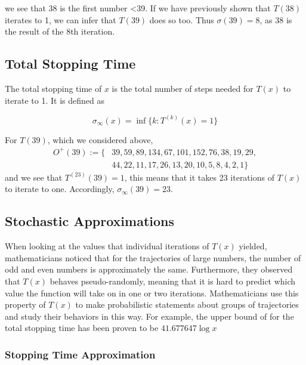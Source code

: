 \documentclass[12pt,a4paper,reqno]{amsart}
\begin{document}
we see that 38 is the first number <39. If we have previously shown that
$T(38)$ iterates to 1, we can infer that $T(39)$ does so too. Thus 
$\sigma(39) = 8$, as 38 is the result of the 8th iteration.

\subsection{Total Stopping Time}

The total stopping time of $x$ is the total number of steps needed for $T(x)$ 
to iterate to 1. It is defined as

\begin{equation}
    \nonumber
    \sigma_{\infty}(x)=\inf\{k:T^{(k)}(x)=1\} 
\end{equation}

For $T(39)$, which we considered above, 
\begin{align}
    \nonumber
    O^+(39):=\{&39,59,89,134,67,101,152,76,38,19,29,\\
    \nonumber
               &44,22,11,17,26,13,20,10,5,8,4,2,1\}
\end{align}
and we see that $T^{(23)}(39)=1$, this means that it takes 23 iterations of
$T(x)$ to iterate to one. Accordingly, $\sigma_{\infty}(39)=23$.

\subsection{Stochastic Approximations}

When looking at the values that individual iterations of $T(x)$ yielded,
mathematicians noticed that for the trajectories of large numbers, the number
of odd and even numbers is approximately the same. Furthermore, they observed
that $T(x)$ behaves pseudo-randomly, meaning that it is hard to predict which
value the function will take on in one or two iterations. Mathematicians use
this property of $T(x)$ to make probabilistic statements about groups of
trajectories and study their behaviors in this way. For example, the upper
bound of for the total stopping time has been proven to be $41.677647 \log x$

\subsubsection{Stopping Time Approximation}
\end{document}
